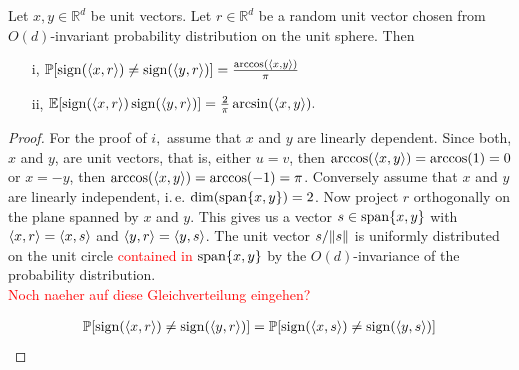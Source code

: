 \begin{lemma}\label{lem:G_id}
	Let $x,y\in\mathbb{R}^d$ be unit vectors. Let $r\in\mathbb{R}^d$ be a random unit vector chosen from $O(d)$-invariant probability distribution on the unit sphere. Then
	\begin{enumerate}
		\item[i,] $\mathbb{P}[\operatorname{sign}(\langle{x},{r}\rangle)\neq\operatorname{sign}(\langle{y},{r}\rangle)]=\frac{\arccos(\langle{x},{y}\rangle)}{\pi}$
		\item[ii,] $\mathbb{E}[\operatorname{sign}(\langle{x},{r}\rangle)\operatorname{sign}(\langle{y},{r}\rangle)]=\frac{2}{\pi}\arcsin(\langle{x},{y}\rangle).$
	\end{enumerate}
\end{lemma}
\begin{proof}
	For the proof of $i,$ assume that $x$ and $y$ are linearly dependent. Since both, $x$ and $y$, are unit vectors, that is, either $u=v$, then $\arccos(\langle{x},{y}\rangle) = \arccos(1)=0$ or $x=-y$, then $\arccos(\langle{x},{y}\rangle) = \arccos(-1) = \pi$.
	Conversely assume that $x$ and $y$ are linearly independent, i.\,e. $\operatorname{dim}(\operatorname{span}\{x,y\})=2$. Now project $r$ orthogonally on the plane spanned by $x$ and $y$. This gives us a vector $s\in \operatorname{span}\{x,y\}$ with $\langle{x},{r}\rangle = \langle{x},{s}\rangle$ and $\langle{y},{r}\rangle = \langle{y},{s}\rangle$. The unit vector $s/ \Vert {s} \Vert$ is uniformly distributed on the unit circle \textcolor{red}{contained in $\operatorname{span}\{x,y\}$} by the $O(d)$-invariance of the probability distribution. \\
	
	\textcolor{red}{Noch naeher auf diese Gleichverteilung eingehen?}
	
	\begin{align*}
		\mathbb{P}[\operatorname{sign}(\langle{x},{r}\rangle)\neq\operatorname{sign}(\langle{y},{r}\rangle)]= \mathbb{P}[\operatorname{sign}(\langle{x},{s}\rangle)\neq\operatorname{sign}(\langle{y},{s}\rangle)] 
	\end{align*} 
	

\end{proof}
